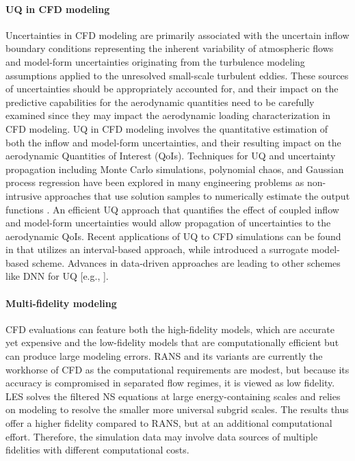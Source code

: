 \paragraph{UQ in CFD modeling} Uncertainties in CFD modeling are primarily associated with the uncertain inflow boundary conditions representing the inherent variability of atmospheric flows and model-form uncertainties originating from the turbulence modeling assumptions applied to the unresolved small-scale turbulent eddies. These sources of uncertainties should be appropriately accounted for, and their impact on the predictive capabilities for the aerodynamic quantities need to be carefully examined since they may impact the aerodynamic loading characterization in CFD modeling. UQ in CFD modeling involves the quantitative estimation of both the inflow and model-form uncertainties, and their resulting impact on the aerodynamic Quantities of Interest (QoIs). Techniques for UQ and uncertainty propagation including Monte Carlo simulations, polynomial chaos, and Gaussian process regression have been explored in many engineering problems as non-intrusive approaches that use solution samples to numerically estimate the output functions \citep{beran2017uncertainty}. An efficient UQ approach that quantifies the effect of coupled inflow and model-form uncertainties would allow propagation of uncertainties to the aerodynamic QoIs. Recent applications of UQ to CFD simulations can be found in \citep{gorle2015quantifying} that utilizes an interval-based approach, while \citep{ding2019inflow} introduced a surrogate model-based scheme. Advances in data-driven approaches are leading to other schemes like DNN for UQ [e.g., \citep{ling2016reynolds, luo2019deep}].

\paragraph{Multi-fidelity modeling} CFD evaluations can feature both the high-fidelity models, which are accurate yet expensive and the low-fidelity models that are computationally efficient but can produce large modeling errors. RANS and its variants are currently the workhorse of CFD \citep{kareem2017computational} as the computational requirements are modest, but because its accuracy is compromised in separated flow regimes, it is viewed as low fidelity. LES solves the filtered NS equations at large energy-containing scales and relies on modeling to resolve the smaller more universal subgrid scales. The results thus offer a higher fidelity compared to RANS, but at an additional computational effort. Therefore, the simulation data may involve data sources of multiple fidelities with different computational costs.


